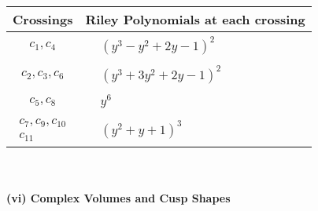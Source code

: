 \documentclass[1p]{elsarticle_modified}
\theoremstyle{definition}
\begin{document}
\begin{tabular}{m{50pt}|m{274pt}}
Crossings & \hspace{64pt}Riley Polynomials at each crossing \\
\hline $$\begin{aligned}c_{1},c_{4}\end{aligned}$$&$\begin{aligned}
&(y^3- y^2+2 y-1)^2
\end{aligned}$\\
\hline $$\begin{aligned}c_{2},c_{3},c_{6}\end{aligned}$$&$\begin{aligned}
&(y^3+3 y^2+2 y-1)^2
\end{aligned}$\\
\hline $$\begin{aligned}c_{5},c_{8}\end{aligned}$$&$\begin{aligned}
&y^6
\end{aligned}$\\
\hline $$\begin{aligned}c_{7},c_{9},c_{10}\\c_{11}\end{aligned}$$&$\begin{aligned}
&(y^2+y+1)^3
\end{aligned}$\\
\hline
\end{tabular}\\~\\
\newpage\flushleft \textbf{(vi) Complex Volumes and Cusp Shapes}
\end{document}
